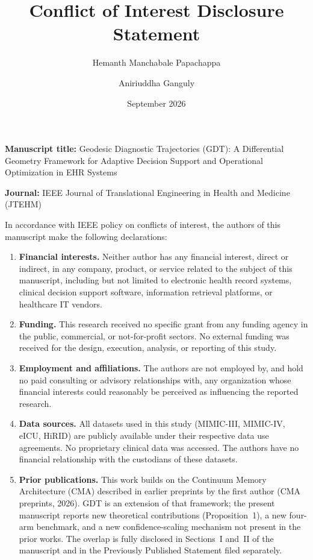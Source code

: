 \documentclass[11pt]{article}
\title{Conflict of Interest Disclosure Statement}
\author{Hemanth Manchabale Papachappa \and Aniriuddha Ganguly}
\date{September 2026}
\begin{document}
\maketitle

\noindent\textbf{Manuscript title:} Geodesic Diagnostic Trajectories (GDT):
A Differential Geometry Framework for Adaptive Decision Support and Operational
Optimization in EHR Systems

\noindent\textbf{Journal:} IEEE Journal of Translational Engineering in Health
and Medicine (JTEHM)

\bigskip

\noindent In accordance with IEEE policy on conflicts of interest, the authors
of this manuscript make the following declarations:

\bigskip

\begin{enumerate}

\item \textbf{Financial interests.}
Neither author has any financial interest, direct or indirect, in any company,
product, or service related to the subject of this manuscript, including but not
limited to electronic health record systems, clinical decision support software,
information retrieval platforms, or healthcare IT vendors.

\item \textbf{Funding.}
This research received no specific grant from any funding agency in the public,
commercial, or not-for-profit sectors. No external funding was received for the
design, execution, analysis, or reporting of this study.

\item \textbf{Employment and affiliations.}
The authors are not employed by, and hold no paid consulting or advisory
relationships with, any organization whose financial interests could reasonably be
perceived as influencing the reported research.

\item \textbf{Data sources.}
All datasets used in this study (MIMIC-III, MIMIC-IV, eICU, HiRID) are publicly
available under their respective data use agreements. No proprietary clinical data
was accessed. The authors have no financial relationship with the custodians of
these datasets.

\item \textbf{Prior publications.}
This work builds on the Continuum Memory Architecture (CMA) described in earlier
preprints by the first author (CMA preprints, 2026). GDT is an extension
of that framework; the present manuscript reports new theoretical contributions
(Proposition~1), a new four-arm benchmark, and a new confidence-scaling mechanism
not present in the prior works. The overlap is fully disclosed in Sections~I
and~II of the manuscript and in the Previously Published Statement filed separately.


\end{enumerate}
\end{document}

